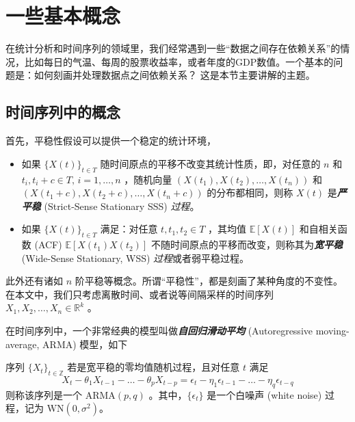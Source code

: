 \section{一些基本概念}

在统计分析和时间序列的领域里，我们经常遇到一些``数据之间存在依赖关系''的情况，比如每日的气温、每周的股票收益率，或者年度的GDP数值。一个基本的问题是：如何刻画并处理数据点之间依赖关系？ 这是本节主要讲解的主题。

\subsection{时间序列中的概念}

首先，平稳性假设可以提供一个稳定的统计环境，

\begin{definition*}[平稳过程]

\begin{itemize}
\tightlist
\item
  如果 $\{X(t)\}_{t\in T}$ 随时间原点的平移不改变其统计性质，即，对任意的 $n$ 和 $t_i,t_i+c\in T,\,i=1,\ldots,n$ ，随机向量 $(X(t_1),X(t_2),\dots,X(t_n))$ 和 $(X(t_1+c),X(t_2+c),\dots,X(t_n+c))$ 的分布都相同，则称 $X(t)$ 是\textbf{\emph{严平稳}} (Strict-Sense Stationary SSS) \emph{过程}。
\item
  如果 $\{X(t)\}_{t\in T}$ 满足：对任意 $t,t_1,t_2\in T$ ，其均值 $\mathbb{E}[X(t)]$ 和自相关函数 (ACF) $\mathbb{E}[X(t_1)X(t_2)]$ 不随时间原点的平移而改变，则称其为\textbf{\emph{宽平稳}} (Wide-Sense Stationary, WSS) \emph{过程}或者弱平稳过程。
\end{itemize}
\end{definition*}

此外还有诸如 $n$ 阶平稳等概念。所谓``平稳性''，都是刻画了某种角度的不变性。在本文中，我们只考虑离散时间、或者说等间隔采样的时间序列 $X_1,X_2,\dots,X_n\in\mathbb R^k$ 。

在时间序列中，一个非常经典的模型叫做\textbf{\emph{自回归滑动平均 }}(Autoregressive moving-average, ARMA) 模型，如下

\begin{definition*}[ARMA]
序列 $\{X_{t}\}_{t\in \mathbb{Z}}$ 若是宽平稳的零均值随机过程，且对任意 $t$ 满足
\[X_{t} - \theta_{1}X_{t - 1} - \dots -\theta_{p}X_{t - p} = \epsilon_{t} - \eta_{1}\epsilon_{t - 1} - \dots -\eta_{q}\epsilon_{t - q}\]
则称该序列是一个 $\mathrm{ARMA}(p,q)$ 。其中，$\{\epsilon_{t}\}$ 是一个白噪声 (white noise) 过程，记为 $\mathrm{WN}(0, \sigma^{2})$。
\end{definition*}

